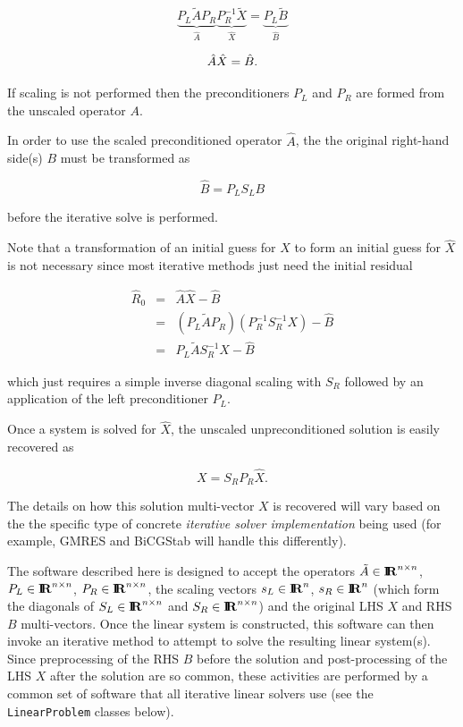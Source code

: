 \documentclass[pdf,ps2pdf,11pt]{SANDreport}
\begin{document}
\[
\underbrace{P_L \tilde{A} P_R}_{\displaystyle{\hat{A}}}
\underbrace{P_R^{-1} \tilde{X}}_{\displaystyle{\hat{X}}}
=
\underbrace{P_L \tilde{B}}_{\displaystyle{\hat{B}}}
\]

\begin{equation}
\nonumber \\
\hat{A} \hat{X}  = \hat{B}.
\label{belos:eqn:PreconditionedSystem}
\end{equation}

If scaling is not performed then the preconditioners $P_L$ and $P_R$
are formed from the unscaled operator $A$.

In order to use the scaled preconditioned operator $\hat{A}$, the the
original right-hand side(s) $B$ must be transformed as

\begin{equation}
\hat{B} = P_L S_L B
\end{equation}

{}\noindent{}before the iterative solve is performed.

Note that a transformation of an initial guess for $X$ to form an
initial guess for $\hat{X}$ is not necessary since most iterative methods
just need the initial residual

\begin{eqnarray}
\hat{R}_0
& = & \hat{A} \hat{X} - \hat{B}
\nonumber \\
& = & \left( P_L \tilde{A} P_R \right) \left( P_R^{-1} S_R^{-1} X \right) - \hat{B}
\nonumber \\
& = & P_L \tilde{A} S_R^{-1} X - \hat{B}
\label{belos:eqn:R_hat_0}
\end{eqnarray}

{}\noindent{}which just requires a simple inverse diagonal scaling
with $S_R$ followed by an application of the left preconditioner
$P_L$.

Once a system is solved for $\hat{X}$, the unscaled unpreconditioned
solution is easily recovered as

\begin{equation}
X = S_R P_R \hat{X}.
\end{equation}

{}\noindent{}The details on how this solution multi-vector $X$ is
recovered will vary based on the the specific type of concrete
{}\textit{iterative solver implementation} being used (for example,
GMRES and BiCGStab will handle this differently).

The software described here is designed to accept the operators
$\tilde{A}\in\mbox{\textbf{I}}\hspace{-0.6ex}\mbox{\textbf{R}}^{n \times n}$, $P_L\in\mbox{\textbf{I}}\hspace{-0.6ex}\mbox{\textbf{R}}^{n \times n}$,
$P_R\in\mbox{\textbf{I}}\hspace{-0.6ex}\mbox{\textbf{R}}^{n \times n}$, the scaling vectors $s_L\in\mbox{\textbf{I}}\hspace{-0.6ex}\mbox{\textbf{R}}^{n}$,
$s_R\in\mbox{\textbf{I}}\hspace{-0.6ex}\mbox{\textbf{R}}^{n}$ (which form the diagonals of $S_L\in\mbox{\textbf{I}}\hspace{-0.6ex}\mbox{\textbf{R}}^{n
\times n}$ and $S_R\in\mbox{\textbf{I}}\hspace{-0.6ex}\mbox{\textbf{R}}^{n \times n}$) and the original
LHS $X$ and RHS $B$ multi-vectors.  Once the linear system is
constructed, this software can then invoke an iterative method to
attempt to solve the resulting linear system(s).  Since preprocessing
of the RHS $B$ before the solution and post-processing of the LHS $X$
after the solution are so common, these activities are performed by a
common set of software that all iterative linear solvers use (see the
{}\texttt{Linear\-Problem} classes below).
\end{document}
